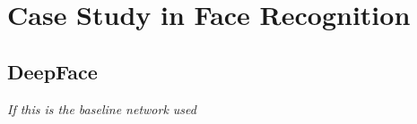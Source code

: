 
\begin{comment}

- tensorboard and digits are still being worked on. deepvis not so much
- tensorboard --> tensorflow and some Keras
- DIGITS and deepvis --> caffe (DIGITS torch as well)
- DIGITS will soon support tensorflow
- keyword is live


- none of them specifically for keras, but tensorboard allows some support
- maybe researchers would not use keras, because it is too high level?
- tensorboard and digits: no advanced visualization. mostly plotting
- digits: managing models and datasets
- digits and tensorboard: while training
- deepvis toolbox: only finished trained networks

\end{comment}

\section{Case Study in Face Recognition}

\subsection{DeepFace}

\textit{If this is the baseline network used}

\cleardoublepage